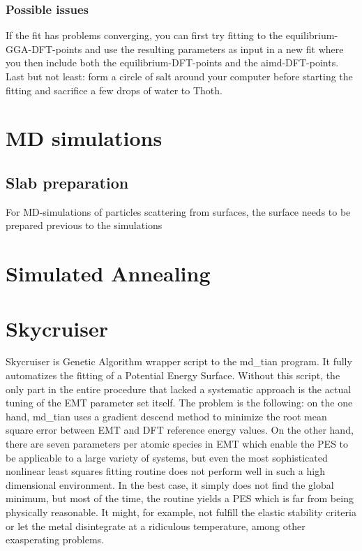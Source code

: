 \documentclass[twoside, 11pt, titlepage, captions=nooneline, a4paper, headsepline]{scrbook}%
\newcommand{\9}{\mathrm}
\newcommand{\0}{\,\mathrm}
\begin{document}
\subsection{Possible issues}
If the fit has problems converging, you can first try fitting to the equilibrium-GGA-DFT-points and use the resulting parameters as input in a new fit where you then include both the equilibrium-DFT-points and the aimd-DFT-points.
Last but not least: form a circle of salt around your computer before starting the fitting and sacrifice a few drops of water to Thoth.\\

\chapter{MD simulations}
\section{Slab preparation}
For MD-simulations of particles scattering from surfaces, the surface needs to be prepared previous to the simulations

\chapter{Simulated Annealing}

\chapter{Skycruiser}
Skycruiser is Genetic Algorithm wrapper script to the md\_tian program. It fully automatizes the fitting of a Potential Energy Surface. Without this script, the only part in the entire procedure that lacked a systematic approach is the actual tuning of the EMT parameter set itself. The problem is the following: on the one hand, md\_tian uses a gradient descend method to minimize the root mean square error between EMT and DFT reference energy values. On the other hand, there are seven parameters per atomic species in EMT which enable the PES to be applicable to a large variety of systems, but even the most sophisticated nonlinear least squares fitting routine does not perform well in such a high dimensional environment. In the best case, it simply does not find the global minimum, but most of the time, the routine yields a PES which is far from being physically reasonable. It might, for example, not fulfill the elastic stability criteria or let the metal disintegrate at a ridiculous temperature, among other exasperating problems.
\end{document}
